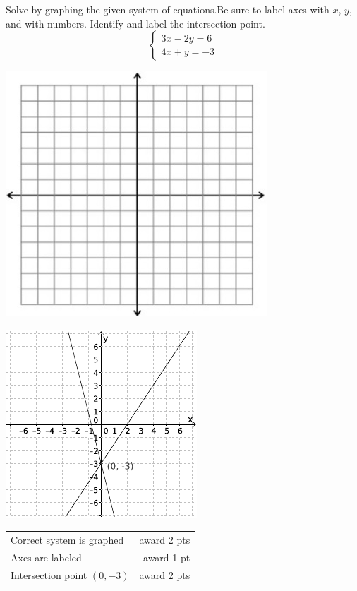 {
	Solve by graphing the given system of equations.Be sure to label axes with $x$, $y$, and with numbers. Identify and label the intersection point. $$\begin{cases}3x-2y=6\\ 4x+y=-3\end{cases}$$ \begin{onlyproblem}\begin{center}\includegraphics{fig-graphpaper.png}\end{center}\end{onlyproblem} \begin{onlysolution}\begin{center}\includegraphics{fig095-10-c-answer}\end{center}\end{onlysolution}
	
}
{
	\begin{tabular}{l r}
	Correct system is graphed & award 2 pts\\
	Axes are labeled & award 1 pt\\
	Intersection point $(0,-3)$ & award 2 pts
	\end{tabular}
}

